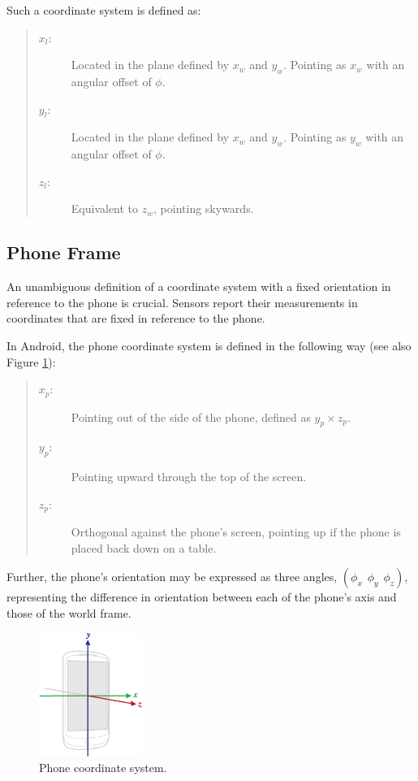 \documentclass{LTHthesis}
\begin{document}
Such a coordinate system is defined as:
%
\begin{quote}
\begin{description}
\item[$x_l$:] Located in the plane defined by $x_w$ and $y_w$. Pointing as $x_w$ with an angular offset of $\phi$.
\item[$y_l$:] Located in the plane defined by $x_w$ and $y_w$. Pointing as $y_w$ with an angular offset of $\phi$.
\item[$z_l$:] Equivalent to $z_w$, pointing skywards.
\end{description}
\end{quote}
%
\subsection{Phone Frame}
%
An unambiguous definition of a coordinate system with a fixed orientation in reference to the phone is crucial. Sensors report their measurements in coordinates that are fixed in reference to the phone. 

In Android, the phone coordinate system is defined in the following way (see also Figure \ref{axis_device}): 
%
\begin{quote}
\begin{description}
\item[$x_p$:] Pointing out of the side of the phone, defined as $y_p \times z_p$.
\item[$y_p$:] Pointing upward through the top of the screen.
\item[$z_p$:] Orthogonal against the phone's screen, pointing up if the phone is placed back down on a table.
\end{description}
\end{quote}
%
Further, the phone's orientation may be expressed as three angles, $(\phi_x \hspace{5pt} \phi_y \hspace{5pt} \phi_z)$, representing the difference in orientation between each of the phone's axis and those of the world frame.
%
\begin{figure}[!hbt]
\begin{center}

\includegraphics[width=0.3\textwidth ]{images/background_on_navigation/axis_device.png}
\end{center}
\caption[]{Phone coordinate system.\footnotemark }\label{axis_device}
\end{figure}
%
\end{document}
